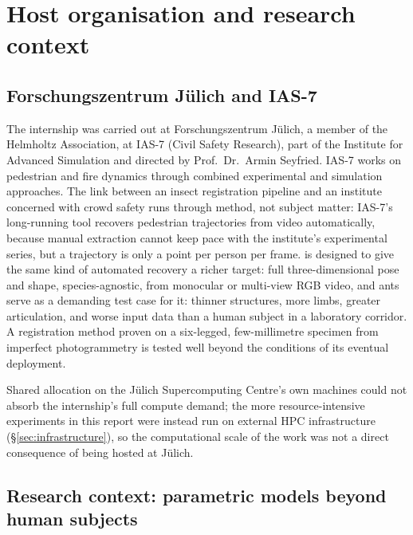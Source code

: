 \chapter{Host organisation and research context}
\label{ch:host}

\section{Forschungszentrum Jülich and IAS-7}

The internship was carried out at Forschungszentrum Jülich, a member of the
Helmholtz Association, at IAS-7 (Civil Safety Research), part of the
Institute for Advanced Simulation and directed by Prof.\ Dr.\ Armin Seyfried.
IAS-7 works on pedestrian and fire dynamics through combined experimental and
simulation approaches. The link between an insect registration pipeline and
an institute concerned with crowd safety runs through method, not subject
matter: IAS-7's long-running tool  recovers pedestrian
trajectories from video automatically, because manual extraction cannot keep
pace with the institute's experimental series, but a trajectory is only a
point per person per frame.  is designed to give the same kind
of automated recovery a richer target: full three-dimensional pose and
shape, species-agnostic, from monocular or multi-view RGB video, and ants
serve as a demanding test case for it: thinner structures, more limbs,
greater articulation, and worse input data than a human subject in a
laboratory corridor. A registration method proven on a six-legged,
few-millimetre specimen from imperfect photogrammetry is tested well beyond
the conditions of its eventual deployment.

Shared allocation on the Jülich Supercomputing Centre's own machines could
not absorb the internship's full compute demand; the more resource-intensive
experiments in this report were instead run on external HPC infrastructure
(\S\ref{sec:infrastructure}), so the computational scale of the work was not
a direct consequence of being hosted at Jülich.

\section{Research context: parametric models beyond human subjects}

